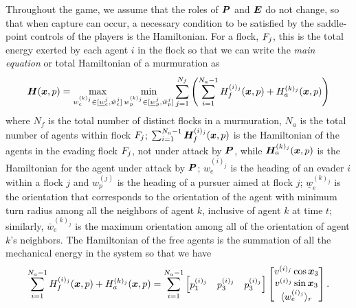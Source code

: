Throughout the game, we assume that the roles of $\bm{P}$  and $\bm{E}$ do not change, so that when capture can occur, a necessary condition to be satisfied by the saddle-point controls of the players is the Hamiltonian. For  a flock, $F_j$, this is the total energy exerted by each agent $i$ in the flock so that we can write the \textit{main equation} or total Hamiltonian of a murmuration as 
%
\begin{align}
\bm{H}(\bm{x}, p) = \max_{w_e^{(k)_j} \in [\underline{w}_e^j, \bar{w}_e^j]}  \min_{w_p^{(k)_j}  \in [\underline{w}_p^{j}, \bar{w}_p^j]} \sum_{j=1}^{N_f} \left(\sum_{i=1}^{N_a-1} H^{(i)_j}_f(\bm{x}, p) + H^{(k)_j}_a(\bm{x}, p) \right)
\label{eq:HamiltonianOverall}
\end{align}
%
where $N_f$ is the total number of distinct flocks in a murmuration, $N_a$ is the total number of agents within flock $F_j$; $\sum_{i=1}^{N_a-1} \bm{H}^{(i)_j}_f(\bm{x}, p)$ is the  Hamiltonian of the agents in the evading flock $F_j$, not under attack by $\bm{P}$, while $\bm{H}^{(k)_j}_a(\bm{x}, p)$ is the Hamiltonian for the agent under attack by $\bm{P}$;  $w_e^{(i)_j}$ is the heading of an evader $i$ within a flock $j$ and $w_p^{(j)}$ is the heading of a pursuer aimed at flock $j$; $\underline{w}_e^{(k)_j}$ is the orientation that corresponds to  the orientation of the agent with minimum turn radius among all the neighbors of agent $k$, inclusive of agent $k$ at time $t$; similarly, $\bar{w}_e^{(k)_j}$ is  the maximum orientation among all of the orientation of agent $k$'s neighbors. The Hamiltonian of the free agents is the summation of all the mechanical energy in the system so that we have
%
\begin{align}
	\sum_{i=1}^{N_a-1} H^{(i)_j}_f(\bm{x}, p) + H^{(k)_j}_a(\bm{x}, p) = \sum_{i=1}^{N_a-1} \begin{bmatrix}
		p_1^{(i)_j} & p_3^{(i)_j} & p_3^{(i)_j}
	\end{bmatrix} 
	\begin{bmatrix}
		v^{(i)_j} \cos \bm{x}_3 \\ v^{(i)_j} \sin \bm{x}_3 \\ \langle w_e^{(i)_j}\rangle_r
	\end{bmatrix}.
\end{align}

